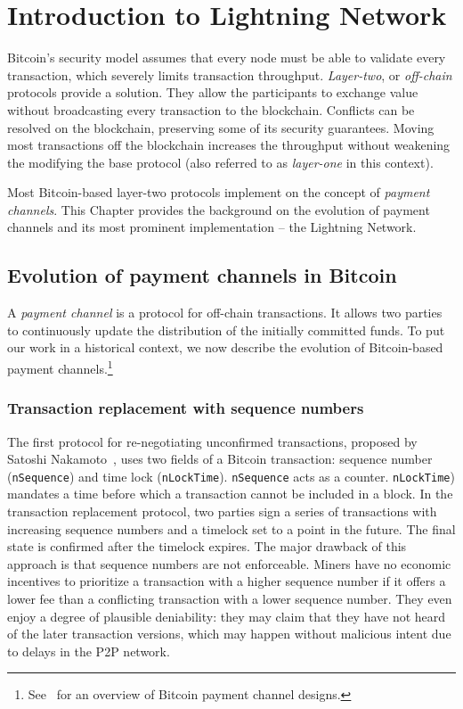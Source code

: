 \chapter{Introduction to Lightning Network}

\label{Chapter05IntroLightning}

Bitcoin's security model assumes that every node must be able to validate every transaction, which severely limits transaction throughput.
\textit{Layer-two}, or \textit{off-chain} protocols provide a solution.
They allow the participants to exchange value without broadcasting every transaction to the blockchain.
Conflicts can be resolved on the blockchain, preserving some of its security guarantees.
Moving most transactions off the blockchain increases the throughput without weakening the modifying the base protocol (also referred to as \textit{layer-one} in this context).

Most Bitcoin-based layer-two protocols implement on the concept of \textit{payment channels}.
This Chapter provides the background on the evolution of payment channels and its most prominent implementation -- the Lightning Network.


\section{Evolution of payment channels in Bitcoin}

A \textit{payment channel} is a protocol for off-chain transactions.
It allows two parties to continuously update the distribution of the initially committed funds.
To put our work in a historical context, we now describe the evolution of Bitcoin-based payment channels.\footnote{See~\cite{McCorry2016} for an overview of Bitcoin payment channel designs.}

\subsection{Transaction replacement with sequence numbers}

The first protocol for re-negotiating unconfirmed transactions, proposed by Satoshi Nakamoto~\cite{Hearn2013}, uses two fields of a Bitcoin transaction: sequence number (\texttt{nSequence}) and time lock (\texttt{nLockTime}).
\texttt{nSequence} acts as a counter.
\texttt{nLockTime}) mandates a time before which a transaction cannot be included in a block.
In the transaction replacement protocol, two parties sign a series of transactions with increasing sequence numbers and a timelock set to a point in the future.
The final state is confirmed after the timelock expires.
The major drawback of this approach is that sequence numbers are not enforceable.
Miners have no economic incentives to prioritize a transaction with a higher sequence number if it offers a lower fee than a conflicting transaction with a lower sequence number.
They even enjoy a degree of plausible deniability: they may claim that they have not heard of the later transaction versions, which may happen without malicious intent due to delays in the P2P network.


